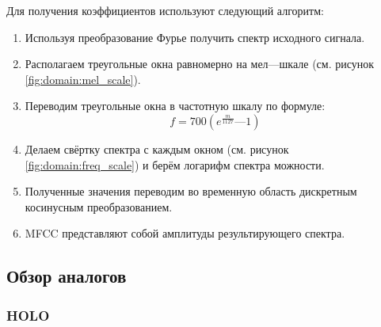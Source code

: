 Для получения коэффициентов используют следующий алгоритм:
\begin{enumerate}[label=\arabic*.]
\item Используя преобразование Фурье получить спектр исходного сигнала.
\item Располагаем треугольные окна равномерно на мел—шкале (см. рисунок \ref{fig:domain:mel_scale}).
\item Переводим треугольные окна в частотную шкалу по формуле:
\begin{equation}\label{eq:flux}
f= 700(e^{\frac{m}{1127}} — 1)
\end{equation}  
\item Делаем свёртку спектра с каждым окном (см. рисунок \ref{fig:domain:freq_scale}) и берём логарифм спектра можности.
\item Полученные значения переводим во временную область дискретным косинусным преобразованием.
\item MFCC представляют собой амплитуды результирующего спектра.
\end{enumerate}



\subsection{Обзор аналогов}
\label{sub:domain:overview_analog}
\subsubsection {HOLO}

